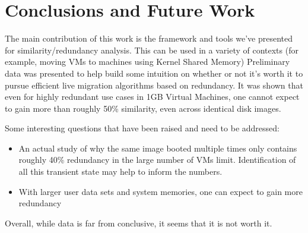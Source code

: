 \documentclass{acm_proc_article-sp}
\begin{document}
\section{Conclusions and Future Work}
The main contribution of this work is the framework and tools we've presented for similarity/redundancy analysis.  This can be used in a variety of contexts (for example, moving VMs to machines using Kernel Shared Memory) Preliminary data was presented to help build some intuition on whether or not it's worth it to pursue efficient live migration algorithms based on redundancy.  It was shown that even for highly redundant use cases in 1GB Virtual Machines, one cannot expect to gain more than roughly 50\% similarity, even across identical disk images.

Some interesting questions that have been raised and need to be addressed:
\begin{itemize}
  \item An actual study of why the same image booted multiple times only contains roughly 40\% redundancy in the large number of VMs limit.  Identification of all this transient state may help to inform the numbers.   
  \item With larger user data sets and system memories, one can expect to gain more redundancy
\end{itemize}

Overall, while data is far from conclusive, it seems that it is not worth it.




\end{document}
